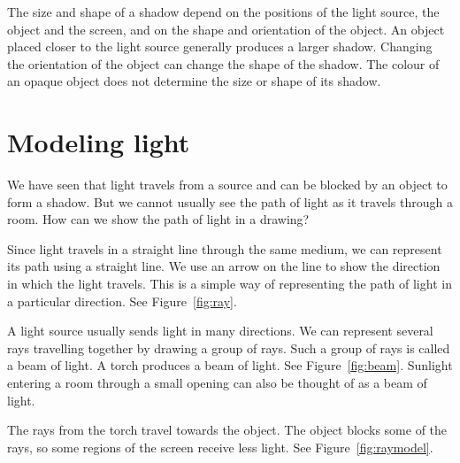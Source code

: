 \documentclass{xtufte-handout}
\begin{document}
The size and shape of a shadow depend on the positions of the light source, the object and the screen, and on the shape and orientation of the object. An object placed closer to the light source generally produces a larger shadow. Changing the orientation of the object can change the shape of the shadow. The colour of an opaque object does not determine the size or shape of its shadow.
\section{Modeling light}
We have seen that light travels from a source and can be blocked by an object to form a shadow. But we cannot usually see the path of light as it travels through a room. How can we show the path of light in a drawing?

Since light travels in a straight line through the same medium, we can represent its path using a straight line. We use an arrow on the line to show the direction in which the light travels. This is a simple way of representing the path of light in a particular direction. See Figure~\ref{fig:ray}.
\begin{marginfigure}
  \caption{\label{fig:ray}A straight line with an arrow used to represent the path of light is called a ray of light.}
\end{marginfigure}

A light source usually sends light in many directions. We can represent several rays travelling together by drawing a group of rays. Such a group of rays is called a beam of light. A torch produces a beam of light. See Figure~\ref{fig:beam}. Sunlight entering a room through a small opening can also be thought of as a beam of light.

\begin{marginfigure}[-15\baselineskip]
  \caption{\label{fig:beam}A beam of light from a flame.}
\end{marginfigure}

The rays from the torch travel towards the object. The object blocks some of the rays, so some regions of the screen receive less light. See Figure~\ref{fig:raymodel}.
\end{document}
